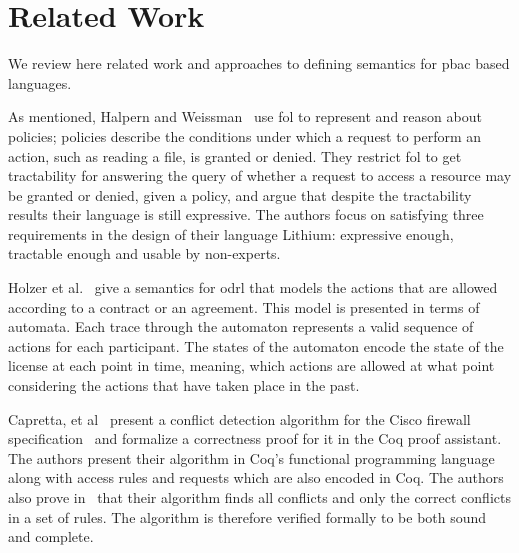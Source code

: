 \documentclass[conference]{IEEEtran}
\begin{document}
\section{Related Work}
We review here related work and approaches to defining semantics for
\ac{pbac} based languages.
 
As mentioned, Halpern and Weissman~\cite{Halpern2008} use \ac{fol} to represent and reason about policies; policies describe the conditions under which a request to perform an action, such as reading a file, is granted or denied. They restrict \ac{fol} to get tractability for answering the query of whether a request to access a resource may be granted or denied, given a policy, and argue that despite the tractability results their language is still expressive. The authors focus on satisfying three requirements in the design of their language Lithium: expressive enough, tractable enough and usable by non-experts.

Holzer et al.~\cite{Holzer} give a semantics for \ac{odrl} that models the actions that are allowed according to a contract or an agreement. This model is presented in terms of automata. Each trace through the automaton represents a valid sequence of actions for each participant. The states of the automaton encode the state of the license at each point in time, meaning, which actions are allowed at what point considering the actions that have taken place in the past. 


Capretta, et al~\cite{CaprettaSFM07} present a conflict detection algorithm for the Cisco firewall specification~\cite{ciscofirewall} and formalize a correctness proof for it in the Coq proof assistant. The authors present their algorithm in Coq's functional programming language along with access rules and requests which are also encoded in Coq. The authors also prove in~\cite{CaprettaSFM07} that their algorithm finds all conflicts and only the correct conflicts in a set of rules. The algorithm is therefore verified formally to be both sound and complete.
\end{document}
